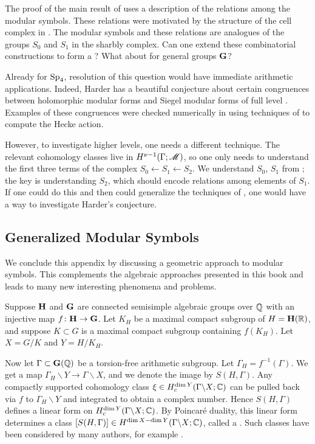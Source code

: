 The proof of the main result of \cite{sympms} uses a description of
the relations among the modular symbols.  These relations were
motivated by the structure of the cell complex in \cite{mmc1, mmc2}.
The modular symbols and these relations are analogues of the groups
$S_{0}$ and $S_{1}$ in the sharbly complex.  Can one 
extend these combinatorial constructions to form a ?  What about for general groups $\mathbf{G}$?  

Already for $\operatorname{Sp}_{4}$, resolution of this question would have immediate
arithmetic applications.  Indeed, Harder has a beautiful conjecture
about certain congruences between holomorphic modular forms and Siegel
modular forms of full level \cite{harder-arbeit}.  Examples of these
congruences were checked numerically in \cite{harder-arbeit} using techniques of
\cite{faber-van.der.geer} to compute the Hecke action.

However, to investigate higher levels, one needs a different technique.
The relevant cohomology classes live in $H^{\nu -1} (\Gamma ; \mathscr M)$,
so one only needs to understand the first three terms of the complex
$S_{0}\leftarrow S_{1}\leftarrow S_{2}$.  We understand $S_{0}$,
$S_{1}$ from \cite{sympms}; the key is understanding $S_{2}$, which
should encode relations among elements of $S_{1}$.  If one could do
this and then could generalize the techniques of \cite{experimental},
one would have a way to investigate Harder's conjecture.

\subsection{Generalized Modular Symbols}
%
We conclude this appendix by discussing a geometric approach to
modular symbols.  This complements the algebraic approaches presented
in this book and leads to many new interesting phenomena and
problems.

Suppose $\mathbf{H}$ and $\mathbf{G}$ are connected semisimple algebraic groups over
$\mathbb{Q}$ with an injective map $f\colon \mathbf{H} \rightarrow \mathbf{G}$.  Let $K_{H}$
be a maximal compact subgroup of $H = \mathbf{H} (\mathbb{R})$, and suppose $K\subset
G$ is a maximal compact subgroup containing $f (K_{H})$.  Let $X =
G/K$ and $Y = H/K_{H}$.

Now let $\Gamma \subset \mathbf{G} (\mathbb{Q})$ be a torsion-free arithmetic
subgroup.  Let $\Gamma_{H} = f^{-1} (\Gamma)$.  We get a map
$\Gamma_{H}\backslash Y \rightarrow \Gamma \backslash X$, and we
denote the image by $S (H,\Gamma)$.  Any
compactly supported cohomology class $\xi \in H_{c}^{\dim Y} (\Gamma
\backslash X; \mathbb{C})$ can be pulled back via $f$ to $\Gamma_{H}\backslash
Y$ and integrated to obtain a complex number.  Hence $S (H,\Gamma)$
defines a linear form on $H_{c}^{\dim Y} (\Gamma
\backslash X; \mathbb{C})$.  By Poincar\'e duality, this linear form
determines a class $[S (H,\Gamma )] \in H^{\dim X - \dim Y} (\Gamma
\backslash X; \mathbb{C})$, called a .  Such classes have been considered by many authors,
for example \cite{ash.borel, venky.speh, harder.modsym,
ash.ginzburg.rallis}.

